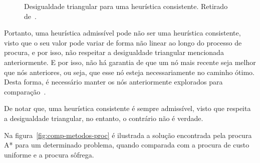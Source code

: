 \begin{figure}[H]
    \begin{center}
    \end{center}
    \caption{Desigualdade triangular para uma heurística consistente.
    Retirado de~\cite{ist:leic:resumos:procura-informada}.}
    \label{fig:heur-consistente}
\end{figure}

Portanto, uma heurística admissível pode não ser uma heurística consistente, visto que o seu valor pode variar de forma não linear ao longo do processo de procura, e por isso, não respeitar a desigualdade triangular mencionada anteriormente.
E por isso, não há garantia de que um nó mais recente seja melhor que nós anteriores, ou seja, que esse nó esteja necessariamente no caminho ótimo.
Desta forma, é necessário manter os nós anteriormente explorados para comparação~\cite{isel:iasa:slides:proc-espaco-estados-parte-3}.

De notar que, uma heurística consistente é sempre admissível, visto que respeita a desigualdade triangular, no entanto, o contrário não é verdade.

Na figura~\ref{fig:comp-metodos-proc} é ilustrada a solução encontrada pela procura A* para um determinado problema, quando comparada com a procura de custo uniforme e a procura sôfrega.

